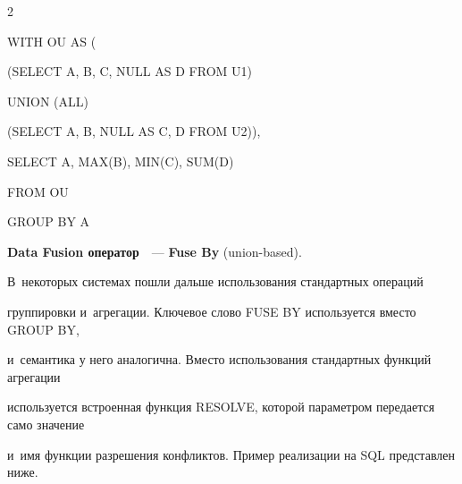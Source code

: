 \begin{multicols}{2}
\begin{figure}
\begin{center}
{ \epsfxsize=128.851mm


 }

 \end{center}

 \vspace*{-9pt}


  \end{figure}





\noindent

{\sf  WITH OU AS (}



\noindent

{\sf   \hspace*{3pt}(SELECT A, B, C, NULL AS D FROM U1)}



\noindent

{\sf         \hspace*{6pt}UNION (ALL)}



\noindent

{\sf    \hspace*{3pt}(SELECT A, B, NULL AS C, D FROM U2)),}



\noindent

{\sf   SELECT A, MAX(B), MIN(C), SUM(D)}



\noindent

{\sf   FROM OU}



\noindent

{\sf   GROUP BY A}



\textbf{Data Fusion оператор}~\cite{13-vov}~--- \textbf{Fuse By} (union-based).

В~некоторых системах пошли дальше использования стандартных операций

группировки и~агрегации. Ключевое слово FUSE BY используется вместо GROUP BY,

и~семантика у него аналогична. Вмес\-то использования стандартных функций агрегации

используется встроенная функция RESOLVE, которой параметром передается само значение

и~имя функции разрешения конфликтов. Пример реализации на SQL представлен ниже.




\end{multicols}
